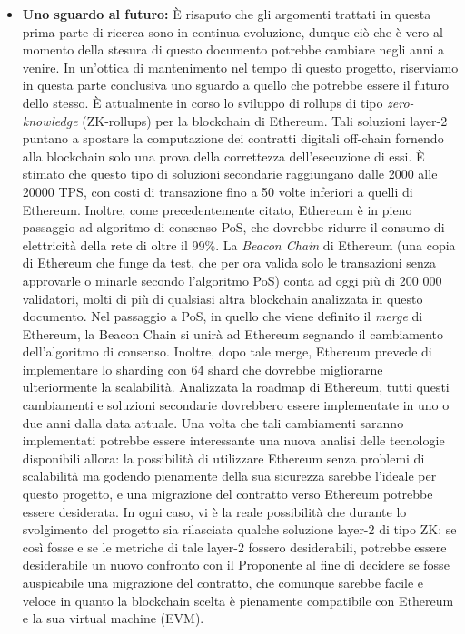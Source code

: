 \documentclass[a4paper, 12pt]{article}
\begin{document}
\begin{itemize}
    \item \textbf{Uno sguardo al futuro: }
    È risaputo che gli argomenti trattati in questa prima parte di ricerca sono in continua evoluzione, dunque ciò che è vero al momento della stesura di questo documento potrebbe cambiare negli anni a venire. In un'ottica di mantenimento nel tempo di questo progetto, riserviamo in questa parte conclusiva uno sguardo a quello che potrebbe essere il futuro dello stesso.
    È attualmente in corso lo sviluppo di rollups di tipo \textit{zero-knowledge} (ZK-rollups) per la blockchain di Ethereum. Tali soluzioni layer-2 puntano a spostare
    la computazione dei contratti digitali off-chain fornendo alla blockchain solo una prova della correttezza dell'esecuzione di essi.
    È stimato che questo tipo di soluzioni secondarie raggiungano dalle 2000 alle 20000 TPS, con costi di transazione fino a 50 volte inferiori a quelli di Ethereum.
    Inoltre, come precedentemente citato, Ethereum è in pieno passaggio ad algoritmo di consenso PoS, che dovrebbe ridurre il consumo di elettricità della rete di oltre il 99\%.
    La \textit{Beacon Chain} di Ethereum (una copia di Ethereum che funge da test, che per ora valida solo le transazioni senza approvarle o minarle secondo l'algoritmo PoS) conta ad oggi più di 200 000 validatori, molti di più di qualsiasi altra blockchain analizzata in questo documento. Nel passaggio a PoS, in quello che viene definito il \textit{merge} di Ethereum, la Beacon Chain si unirà ad Ethereum segnando il cambiamento dell'algoritmo di consenso. Inoltre, dopo tale merge, Ethereum prevede di implementare lo sharding con 64 shard che dovrebbe migliorarne ulteriormente la scalabilità.
    Analizzata la roadmap di Ethereum, tutti questi cambiamenti e soluzioni secondarie dovrebbero essere implementate in uno o due anni dalla data attuale.
    Una volta che tali cambiamenti saranno implementati potrebbe essere interessante una nuova analisi delle tecnologie disponibili allora: la possibilità di utilizzare Ethereum senza problemi di scalabilità ma godendo pienamente della sua sicurezza sarebbe l'ideale per questo progetto, e una migrazione del contratto verso Ethereum potrebbe essere desiderata.
    In ogni caso, vi è la reale possibilità che durante lo svolgimento del progetto sia rilasciata qualche soluzione layer-2 di tipo ZK: se così fosse e se le metriche
    di tale layer-2 fossero desiderabili, potrebbe essere desiderabile un nuovo confronto con il Proponente al fine di decidere se fosse auspicabile una migrazione del contratto, che comunque
    sarebbe facile e veloce in quanto la blockchain scelta è pienamente compatibile con Ethereum e la sua virtual machine (EVM).

\end{itemize}
\end{document}
